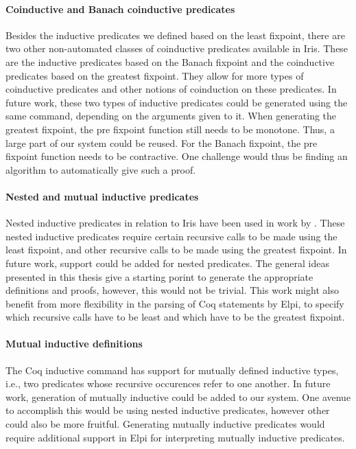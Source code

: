 \documentclass[thesis.tex]{subfiles}
\begin{document}
\paragraph{Coinductive and Banach coinductive predicates}
Besides the inductive predicates we defined based on the least fixpoint, there are two other non-automated classes of coinductive predicates available in Iris. These are the inductive predicates based on the Banach fixpoint and the coinductive predicates based on the greatest fixpoint. They allow for more types of coinductive predicates and other notions of coinduction on these predicates. In future work, these two types of inductive predicates could be generated using the same  command, depending on the arguments given to it. When generating the greatest fixpoint, the pre fixpoint function still needs to be monotone. Thus, a large part of our system could be reused. For the Banach fixpoint, the pre fixpoint function needs to be contractive. One challenge would thus be finding an algorithm to automatically give such a proof.

\paragraph{Nested and mutual inductive predicates}
Nested inductive predicates in relation to Iris have been used in work by  \cite{gaherSimulirisSeparationLogic2022}. These nested inductive predicates require certain recursive calls to be made using the least fixpoint, and other recursive calls to be made using the greatest fixpoint. In future work, support could be added for nested predicates. The general ideas presented in this thesis give a starting porint to generate the appropriate definitions and proofs, however, this would not be trivial. This work might also benefit from more flexibility in the parsing of  Coq statements by Elpi, to specify which recursive calls have to be least and which have to be the greatest fixpoint.

\paragraph{Mutual inductive definitions}
The Coq inductive command has support for mutually defined inductive types, i.e., two predicates whose recursive occurences refer to one another. In future work, generation of mutually inductive could be added to our system. One avenue to accomplish this would be using nested inductive predicates, however other could also be more fruitful. Generating mutually inductive predicates would require additional support in Elpi for interpreting mutually inductive predicates.
\end{document}
